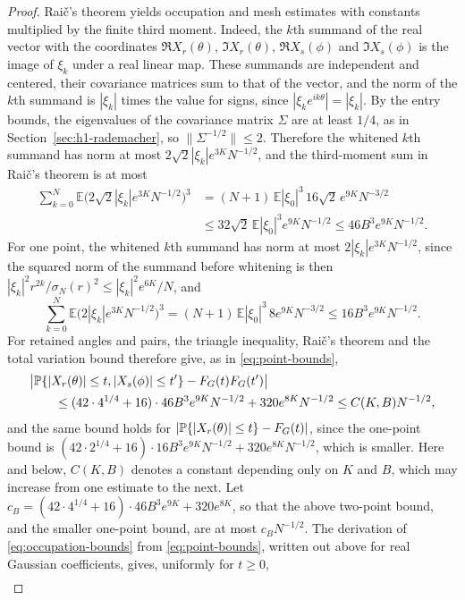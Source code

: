 \begin{proof}
Rai\v{c}'s theorem yields occupation and mesh estimates with
constants multiplied by the finite third moment.
Indeed, the $k$th summand of the real vector with the coordinates
$\Re X_r(\theta)$, $\Im X_r(\theta)$, $\Re X_s(\phi)$ and $\Im X_s(\phi)$
is the image of $\xi_k$ under a real linear map.
These summands are independent and centered, their covariance matrices sum
to that of the vector, and the norm of the $k$th summand is $|\xi_k|$
times the value for signs, since $|\xi_ke^{ik\theta}|=|\xi_k|$.
By the entry bounds, the eigenvalues of the covariance matrix $\Sigma$
are at least $1/4$, as in Section~\ref{sec:h1-rademacher}, so
$\|\Sigma^{-1/2}\|\le2$.
Therefore the whitened $k$th summand has norm at most
$2\sqrt2|\xi_k|e^{3K}N^{-1/2}$, and the third-moment sum in Rai\v{c}'s
theorem is at most
\begin{align*}
 \sum_{k=0}^N\mathbb E\bigl(2\sqrt2|\xi_k|e^{3K}N^{-1/2}\bigr)^3
 &=(N+1)\,\mathbb E|\xi_0|^3\,16\sqrt2\,e^{9K}N^{-3/2}\\
 &\le32\sqrt2\,\mathbb E|\xi_0|^3e^{9K}N^{-1/2}
 \le46B^3e^{9K}N^{-1/2}.
\end{align*}
For one point, the whitened $k$th summand has norm at most
$2|\xi_k|e^{3K}N^{-1/2}$, since the squared norm of the summand before
whitening is then $|\xi_k|^2r^{2k}/\sigma_N(r)^2\le|\xi_k|^2e^{6K}/N$, and
\[
 \sum_{k=0}^N\mathbb E\bigl(2|\xi_k|e^{3K}N^{-1/2}\bigr)^3
 =(N+1)\,\mathbb E|\xi_0|^3\,8e^{9K}N^{-3/2}
 \le16B^3e^{9K}N^{-1/2}.
\]
For retained angles and pairs, the triangle inequality, Rai\v{c}'s
theorem and the total variation bound therefore give, as in
\eqref{eq:point-bounds},
\begin{align*}
 &\bigl|\mathbb P\{|X_r(\theta)|\le t,|X_s(\phi)|\le t'\}
 -F_G(t)F_G(t')\bigr|\\
 &\qquad\le(42\cdot4^{1/4}+16)\cdot46B^3e^{9K}N^{-1/2}+320e^{8K}N^{-1/2}
 \le C(K,B)N^{-1/2},
\end{align*}
and the same bound holds for $|\mathbb P\{|X_r(\theta)|\le t\}-F_G(t)|$,
since the one-point bound is
$(42\cdot2^{1/4}+16)\cdot16B^3e^{9K}N^{-1/2}+320e^{8K}N^{-1/2}$, which is
smaller.
Here and below, $C(K,B)$ denotes a constant depending only on $K$
and $B$, which may increase from one estimate to the next.
Let $c_B=(42\cdot4^{1/4}+16)\cdot46B^3e^{9K}+320e^{8K}$,
so that the above two-point bound, and the smaller one-point bound, are
at most $c_BN^{-1/2}$.
The derivation of \eqref{eq:occupation-bounds} from
\eqref{eq:point-bounds}, written out above for real Gaussian
coefficients, gives, uniformly for $t\ge0$,
\begin{align*}

\end{align*}
\end{proof}
